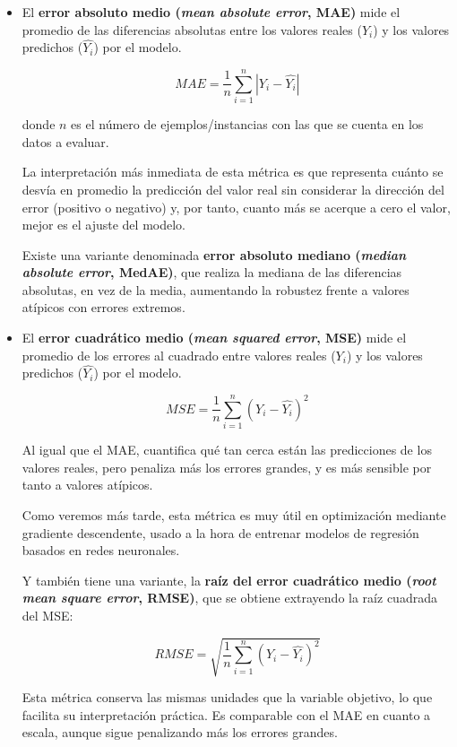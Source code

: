 \begin{itemize}
    \item El \textbf{error absoluto medio (\textit{mean absolute error}, MAE)} mide el promedio de las diferencias 
    absolutas entre los valores reales ($Y_i$) y los valores predichos ($\hat{Y_i}$) por el modelo.

    $$
    MAE = \frac{1}{n} \sum_{i=1}^n{|Y_i - \hat{Y_i}|}
    $$

    donde $n$ es el número de ejemplos/instancias con las que se cuenta en los datos a evaluar.

    La interpretación más inmediata de esta métrica es que representa cuánto se desvía en promedio la 
    predicción del valor real sin considerar la dirección del error (positivo o negativo) y, por tanto, cuanto 
    más se acerque a cero el valor, mejor es el ajuste del modelo.

    Existe una variante denominada \textbf{error absoluto mediano (\textit{median absolute error}, MedAE)}, que 
    realiza la mediana de las diferencias absolutas, en vez de la media, aumentando la robustez frente a valores 
    atípicos con errores extremos.

    \item El \textbf{error cuadrático medio (\textit{mean squared error}, MSE)} mide el promedio de los errores al 
    cuadrado entre valores reales ($Y_i$) y los valores predichos ($\hat{Y_i}$) por el modelo.
    
    $$
    MSE = \frac{1}{n} \sum_{i=1}^n{(Y_i - \hat{Y_i})^2}
    $$

    Al igual que el MAE, cuantifica qué tan cerca están las predicciones de los valores reales, pero penaliza
    más los errores grandes, y es más sensible por tanto a valores atípicos.

    Como veremos más tarde, esta métrica es muy útil en optimización mediante gradiente descendente, usado 
    a la hora de entrenar modelos de regresión basados en redes neuronales.

    Y también tiene una variante, la \textbf{raíz del error cuadrático medio (\textit{root mean square error}, 
    RMSE)}, que se obtiene extrayendo la raíz cuadrada del MSE:

    $$
    RMSE = \sqrt{\frac{1}{n} \sum_{i=1}^{n}{(Y_i-\hat{Y_i})^2} }
    $$

    Esta métrica conserva las mismas unidades que la variable objetivo, lo que facilita su interpretación 
    práctica. Es comparable con el MAE en cuanto a escala, aunque sigue penalizando más los errores grandes.


\end{itemize}

